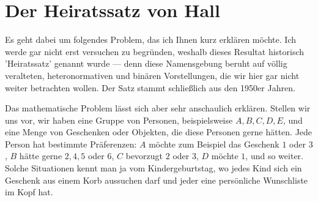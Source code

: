 \section{Der Heiratssatz von Hall}

\begin{spoken-clean}[01:04:39 - 01:05:58]
Es geht dabei um folgendes Problem, das ich Ihnen kurz erklären möchte. Ich werde gar nicht erst versuchen zu begründen, weshalb dieses Resultat historisch 'Heiratssatz' genannt wurde --- denn diese Namensgebung beruht auf völlig veralteten, heteronormativen und binären Vorstellungen, die wir hier gar nicht weiter betrachten wollen. Der Satz stammt schließlich aus den 1950er Jahren.
\end{spoken-clean}

\begin{spoken-clean}[01:05:58 - 01:07:08]
Das mathematische Problem lässt sich aber sehr anschaulich erklären. Stellen wir uns vor, wir haben eine Gruppe von Personen, beispielsweise $A, B, C, D, E$, und eine Menge von Geschenken oder Objekten, die diese Personen gerne hätten. Jede Person hat bestimmte Präferenzen: $A$ möchte zum Beispiel das Geschenk $1$ oder $3$, $B$ hätte gerne $2, 4, 5$ oder $6$, $C$ bevorzugt $2$ oder $3$, $D$ möchte $1$, und so weiter. Solche Situationen kennt man ja vom Kindergeburtstag, wo jedes Kind sich ein Geschenk aus einem Korb aussuchen darf und jeder eine persönliche Wunschliste im Kopf hat.
\end{spoken-clean}

